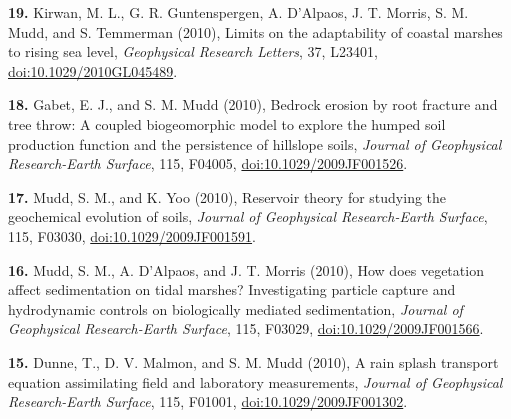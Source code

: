 \documentclass[10pt, a4paper]{article}
\newcommand{\years}[1]{\marginnote{\scriptsize #1}}
\begin{document}
\years{2010}\hangindent=0.7cm\textbf{19.} Kirwan, M. L., G. R. Guntenspergen, A. D'Alpaos, J. T. Morris, S. M. Mudd, and S. Temmerman (2010), Limits on the adaptability of coastal marshes to rising sea level, \textit{Geophysical Research Letters}, 37, L23401, \href{http://dx.doi.org/doi:10.1029/2010GL045489}{doi:10.1029/2010GL045489}.\par
\hangindent=0.7cm\textbf{18.} Gabet, E. J., and S. M. Mudd (2010), Bedrock erosion by root fracture and tree throw: A coupled biogeomorphic model to explore the humped soil production function and the persistence of hillslope soils, \textit{Journal of Geophysical Research-Earth Surface}, 115, F04005, \href{http://dx.doi.org/doi:10.1029/2009JF001526}{doi:10.1029/2009JF001526}.\par
\hangindent=0.7cm\textbf{17.} Mudd, S. M., and K. Yoo (2010), Reservoir theory for studying the geochemical evolution of soils, \textit{Journal of Geophysical Research-Earth Surface}, 115, F03030, \href{http://dx.doi.org/doi:10.1029/2009JF001591}{doi:10.1029/2009JF001591}.\par
\hangindent=0.7cm\textbf{16.} Mudd, S. M., A. D'Alpaos, and J. T. Morris (2010), How does vegetation affect sedimentation on tidal marshes? Investigating particle capture and hydrodynamic controls on biologically mediated sedimentation, \textit{Journal of Geophysical Research-Earth Surface}, 115, F03029, \href{http://dx.doi.org/doi:10.1029/2009JF001566}{doi:10.1029/2009JF001566}.\par
\hangindent=0.7cm\textbf{15.} Dunne, T., D. V. Malmon, and S. M. Mudd (2010), A rain splash transport equation assimilating field and laboratory measurements, \textit{Journal of Geophysical Research-Earth Surface}, 115, F01001, \href{http://dx.doi.org/doi:10.1029/2009JF001302}{doi:10.1029/2009JF001302}.\par
\end{document}
